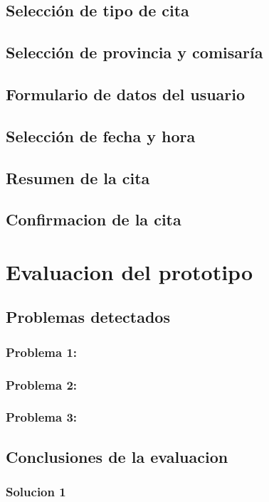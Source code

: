 \documentclass[a4paper,11pt]{article}
\begin{document}
\subsection{Selección de tipo de cita}
\subsection{Selección de provincia y comisaría}
\subsection{Formulario de datos del usuario}
\subsection{Selección de fecha y hora}
\subsection{Resumen de la cita}
\subsection{Confirmacion de la cita}


\section{Evaluacion del prototipo}
\subsection{Problemas detectados}
\subsubsection{Problema 1:}
\subsubsection{Problema 2:}
\subsubsection{Problema 3:}

\subsection{Conclusiones de la evaluacion}
\subsubsection{Solucion 1}
\end{document}
